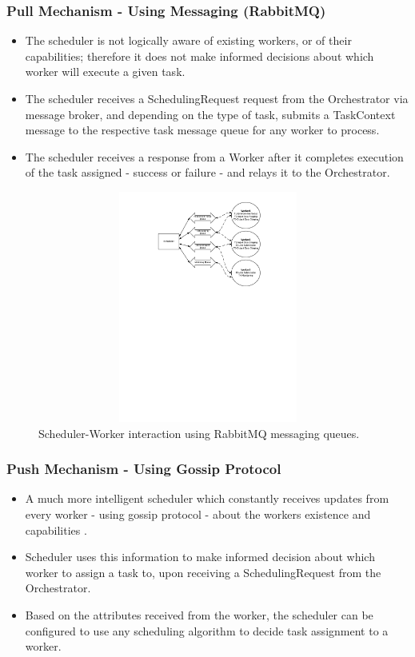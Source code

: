 \documentclass[sigconf]{acmart}
\begin{document}
\subsubsection{Pull Mechanism - Using Messaging (RabbitMQ)}
\begin{itemize}
\item The scheduler is not logically aware of existing workers, or of their capabilities; therefore it does not make informed decisions about which worker will execute a given task.
\item The scheduler receives a SchedulingRequest request from the Orchestrator via message broker, and depending on the type of task, submits a TaskContext message to the respective task message queue for any worker to process.
\item The scheduler receives a response from a Worker after it completes execution of the task assigned - success or failure - and relays it to the Orchestrator.
\end{itemize}

\begin{figure}
\includegraphics[height=3in, width=7in]{figures/scheduler-pull-mechanism.pdf}
\caption{Scheduler-Worker interaction using RabbitMQ messaging queues.}
\end{figure}

\subsubsection{Push Mechanism - Using Gossip Protocol}
\begin{itemize}
\item A much more intelligent scheduler which constantly receives updates from every worker - using gossip protocol - about the workers existence and capabilities \cite{kermarrec2007gossiping}.
\item Scheduler uses this information to make informed decision about which worker to assign a task to, upon receiving a SchedulingRequest from the Orchestrator.
\item Based on the attributes received from the worker, the scheduler can be configured to use any scheduling algorithm to decide task assignment to a worker.
\end{itemize}
\end{document}
